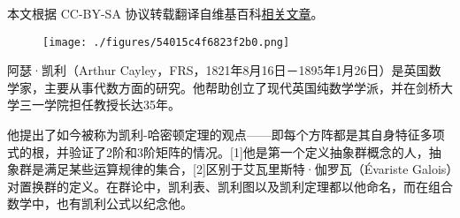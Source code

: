 
本文根据 CC-BY-SA 协议转载翻译自维基百科\href{https://en.wikipedia.org/wiki/Arthur_Cayley}{相关文章}。

\begin{figure}[ht]
\centering
\texttt{[image: ./figures/54015c4f6823f2b0.png]}
\caption{} \label{fig_Cayley_1}
\end{figure}
阿瑟·凯利（Arthur Cayley，FRS，1821年8月16日－1895年1月26日）是英国数学家，主要从事代数方面的研究。他帮助创立了现代英国纯数学学派，并在剑桥大学三一学院担任教授长达35年。

他提出了如今被称为凯利-哈密顿定理的观点——即每个方阵都是其自身特征多项式的根，并验证了2阶和3阶矩阵的情况。[1]他是第一个定义抽象群概念的人，抽象群是满足某些运算规律的集合，[2]区别于艾瓦里斯特·伽罗瓦（Évariste Galois）对置换群的定义。在群论中，凯利表、凯利图以及凯利定理都以他命名，而在组合数学中，也有凯利公式以纪念他。

